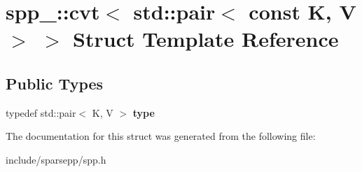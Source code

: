 \hypertarget{structspp___1_1cvt_3_01std_1_1pair_3_01const_01_k_00_01_v_01_4_01_4}{}\section{spp\+\_\+\+:\+:cvt$<$ std\+:\+:pair$<$ const K, V $>$ $>$ Struct Template Reference}
\label{structspp___1_1cvt_3_01std_1_1pair_3_01const_01_k_00_01_v_01_4_01_4}
\subsection*{Public Types}
\begin{DoxyCompactItemize}
\item 
typedef std\+::pair$<$ K, V $>$ {\bfseries type}\hypertarget{structspp___1_1cvt_3_01std_1_1pair_3_01const_01_k_00_01_v_01_4_01_4_a5fb0df34db881bb71feba7764094f813}{}\label{structspp___1_1cvt_3_01std_1_1pair_3_01const_01_k_00_01_v_01_4_01_4_a5fb0df34db881bb71feba7764094f813}

\end{DoxyCompactItemize}


The documentation for this struct was generated from the following file\+:\begin{DoxyCompactItemize}
\item 
include/sparsepp/spp.\+h\end{DoxyCompactItemize}
